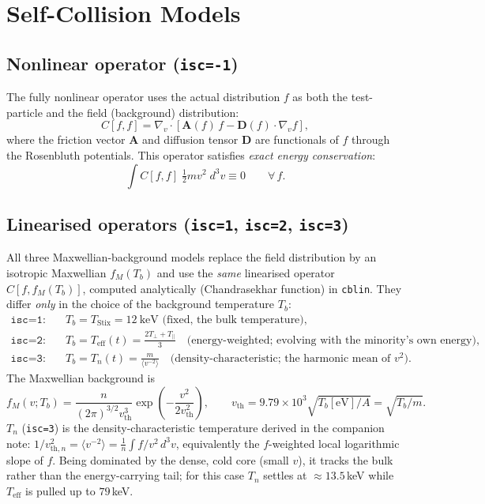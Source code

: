 \documentclass[11pt,a4paper]{article}
\begin{document}
\section{Self-Collision Models}

\subsection{Nonlinear operator (\texttt{isc=-1})}

The fully nonlinear operator uses the actual distribution $f$ as both the
test-particle and the field (background) distribution:
\begin{equation}
  C[f,f] = \nabla_v \cdot
    \left[ \mathbf{A}(f)\,f - \mathbf{D}(f)\cdot\nabla_v f \right],
\end{equation}
where the friction vector $\mathbf{A}$ and diffusion tensor $\mathbf{D}$ are
functionals of $f$ through the Rosenbluth potentials. This operator satisfies
\emph{exact energy conservation}:
\begin{equation}
  \int C[f,f]\;\tfrac{1}{2}m v^2\; d^3v \equiv 0 \qquad \forall\, f.
\end{equation}

\subsection{Linearised operators (\texttt{isc=1}, \texttt{isc=2}, \texttt{isc=3})}

All three Maxwellian-background models replace the field distribution by an
isotropic Maxwellian $f_M(T_b)$ and use the \emph{same} linearised operator
$C[f, f_M(T_b)]$, computed analytically (Chandrasekhar function) in
\texttt{cblin}. They differ \emph{only} in the choice of the background
temperature $T_b$:
\begin{align}
  \texttt{isc=1}:&\quad T_b = T_\text{Stix} = 12~\text{keV (fixed, the bulk
    temperature)},\\
  \texttt{isc=2}:&\quad T_b = T_\text{eff}(t) = \frac{2T_\perp + T_\parallel}{3}
    \quad\text{(energy-weighted; evolving with the minority's own energy)},\\
  \texttt{isc=3}:&\quad T_b = T_n(t) = \frac{m}{\langle v^{-2}\rangle}
    \quad\text{(density-characteristic; the harmonic mean of $v^2$)}.
\end{align}
The Maxwellian background is
\begin{equation}
  f_M(v; T_b) = \frac{n}{(2\pi)^{3/2} v_\text{th}^3}
    \exp\!\left(-\frac{v^2}{2v_\text{th}^2}\right),
  \qquad
  v_\text{th} = 9.79\times10^3\sqrt{T_b[\text{eV}]/A} = \sqrt{T_b/m}.
\end{equation}
$T_n$ (\texttt{isc=3}) is the density-characteristic temperature derived in the
companion note: $1/v_{\text{th},n}^2 = \langle v^{-2}\rangle =
\tfrac1n\!\int f/v^2\,d^3v$, equivalently the $f$-weighted local logarithmic
slope of $f$. Being dominated by the dense, cold core (small $v$), it tracks
the bulk rather than the energy-carrying tail; for this case $T_n$ settles at
$\approx13.5$\,keV while $T_\text{eff}$ is pulled up to $79$\,keV.
\end{document}
